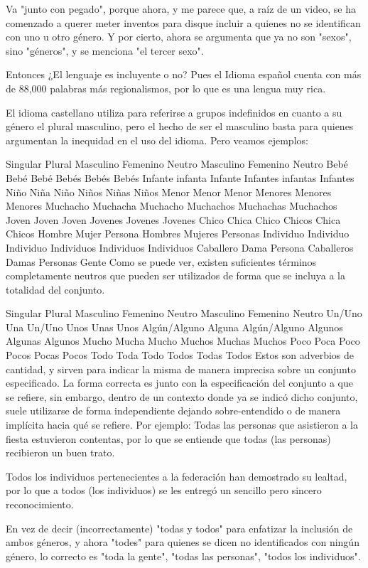 Va "junto con pegado", porque ahora, y me parece que, a raíz de un video, se ha comenzado a querer meter inventos para disque incluir a quienes no se identifican con uno u otro género. Y por cierto, ahora se argumenta que ya no son "sexos", sino "géneros", y se menciona "el tercer sexo".

Entonces ¿El lenguaje es incluyente o no? Pues el Idioma español cuenta con más de 88,000 palabras más regionalismos, por lo que es una lengua muy rica.

El idioma castellano utiliza para referirse a grupos indefinidos en cuanto a su género el plural masculino, pero el hecho de ser el masculino basta para quienes argumentan la inequidad en el uso del idioma. Pero veamos ejemplos:

Singular	Plural
Masculino	Femenino	Neutro	Masculino	Femenino	Neutro
Bebé	Bebé	Bebé	Bebés	Bebés	Bebés
Infante	infanta	Infante	Infantes	infantas	Infantes
Niño	Niña	Niño	Niños	Niñas	Niños
Menor	Menor	Menor	Menores	Menores	Menores
Muchacho	Muchacha	Muchacho	Muchachos	Muchachas	Muchachos
Joven	Joven	Joven	Jovenes	Jovenes	Jovenes
Chico	Chica	Chico	Chicos	Chica	Chicos
Hombre	Mujer	Persona	Hombres	Mujeres	Personas
Individuo	Individuo	Individuo	Individuos	Individuos	Individuos
Caballero	Dama	Persona	Caballeros	Damas	Personas
 	Gente
Como se puede ver, existen suficientes términos completamente neutros que pueden ser utilizados de forma que se incluya a la totalidad del conjunto.

Singular	Plural
Masculino	Femenino	Neutro	Masculino	Femenino	Neutro
Un/Uno	Una	Un/Uno	Unos	Unas	Unos
Algún/Alguno	Alguna	Algún/Alguno	Algunos	Algunas	Algunos
Mucho	Mucha	Mucho	Muchos	Muchas	Muchos
Poco	Poca	Poco	Pocos	Pocas	Pocos
Todo	Toda	Todo	Todos	Todas	Todos
Estos son adverbios de cantidad, y sirven para indicar la misma de manera imprecisa sobre un conjunto especificado. La forma correcta es junto con la especificación del conjunto a que se refiere, sin embargo, dentro de un contexto donde ya se indicó dicho conjunto, suele utilizarse de forma independiente dejando sobre-entendido o de manera implícita hacia qué se refiere. Por ejemplo: Todas las personas que asistieron a la fiesta estuvieron contentas, por lo que se entiende que todas (las personas) recibieron un buen trato.

Todos los individuos pertenecientes a la federación han demostrado su lealtad, por lo que a todos (los individuos) se les entregó un sencillo pero sincero reconocimiento.

En vez de decir (incorrectamente) "todas y todos" para enfatizar la inclusión de ambos géneros, y ahora "todes" para quienes se dicen no identificados con ningún género, lo correcto es "toda la gente", "todas las personas", "todos los individuos".

